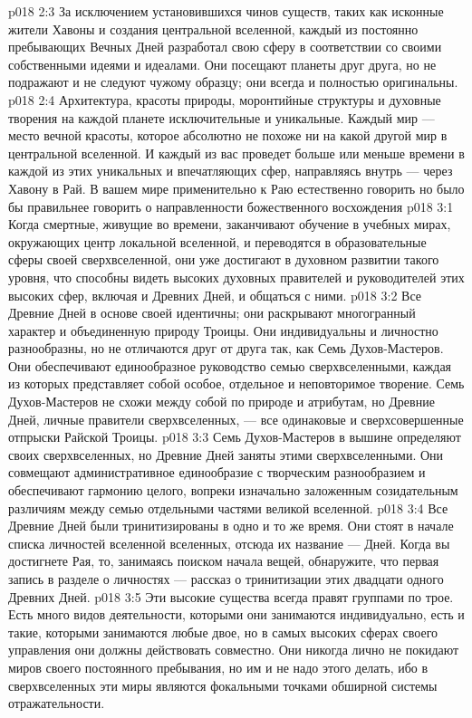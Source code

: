 \vs p018 2:3 За исключением установившихся чинов существ, таких как исконные жители Хавоны и создания центральной вселенной, каждый из постоянно пребывающих Вечных Дней разработал свою сферу в соответствии со своими собственными идеями и идеалами. Они посещают планеты друг друга, но не подражают и не следуют чужому образцу; они всегда и полностью оригинальны.
\vs p018 2:4 Архитектура, красоты природы, моронтийные структуры и духовные творения на каждой планете исключительные и уникальные. Каждый мир --- место вечной красоты, которое абсолютно не похоже ни на какой другой мир в центральной вселенной. И каждый из вас проведет больше или меньше времени в каждой из этих уникальных и впечатляющих сфер, направляясь внутрь --- через Хавону в Рай. В вашем мире применительно к Раю естественно говорить  но было бы правильнее говорить о направленности божественного восхождения 
\vs p018 3:1 Когда смертные, живущие во времени, заканчивают обучение в учебных мирах, окружающих центр локальной вселенной, и переводятся в образовательные сферы своей сверхвселенной, они уже достигают в духовном развитии такого уровня, что способны видеть высоких духовных правителей и руководителей этих высоких сфер, включая и Древних Дней, и общаться с ними.
\vs p018 3:2 Все Древние Дней в основе своей идентичны; они раскрывают многогранный характер и объединенную природу Троицы. Они индивидуальны и личностно разнообразны, но не отличаются друг от друга так, как Семь Духов\hyp{}Мастеров. Они обеспечивают единообразное руководство семью сверхвселенными, каждая из которых представляет собой особое, отдельное и неповторимое творение. Семь Духов\hyp{}Мастеров не схожи между собой по природе и атрибутам, но Древние Дней, личные правители сверхвселенных, --- все одинаковые и сверхсовершенные отпрыски Райской Троицы.
\vs p018 3:3 Семь Духов\hyp{}Мастеров в вышине определяют  своих сверхвселенных, но Древние Дней заняты  этими сверхвселенными. Они совмещают административное единообразие с творческим разнообразием и обеспечивают гармонию целого, вопреки изначально заложенным созидательным различиям между семью отдельными частями великой вселенной.
\vs p018 3:4 \pc Все Древние Дней были тринитизированы в одно и то же время. Они стоят в начале списка личностей вселенной вселенных, отсюда их название ---  Дней. Когда вы достигнете Рая, то, занимаясь поиском начала вещей, обнаружите, что первая запись в разделе о личностях --- рассказ о тринитизации этих двадцати одного Древних Дней.
\vs p018 3:5 \pc Эти высокие существа всегда правят группами по трое. Есть много видов деятельности, которыми они занимаются индивидуально, есть и такие, которыми занимаются любые двое, но в самых высоких сферах своего управления они должны действовать совместно. Они никогда лично не покидают миров своего постоянного пребывания, но им и не надо этого делать, ибо в сверхвселенных эти миры являются фокальными точками обширной системы отражательности.
